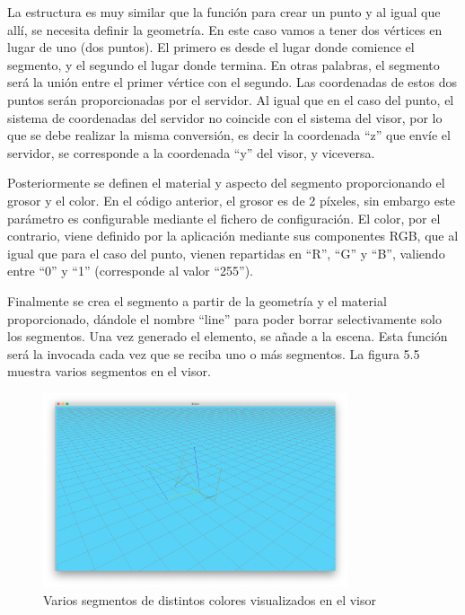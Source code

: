 La estructura es muy similar que la función para crear un punto y al igual que allí, se necesita definir la geometría. En este caso vamos a tener dos vértices en lugar de uno (dos puntos). El primero es desde el lugar donde comience el segmento, y el segundo el lugar donde termina. En otras palabras, el segmento será la unión entre el primer vértice con el segundo. Las coordenadas de estos dos puntos serán proporcionadas por el servidor. Al igual que en el caso del punto, el sistema de coordenadas del servidor no coincide con el sistema del visor, por lo que se debe realizar la misma conversión, es decir la coordenada ``z'' que envíe el servidor, se corresponde a la coordenada ``y'' del visor, y viceversa.

Posteriormente se definen el material y aspecto del segmento proporcionando el grosor y el color. En el código anterior, el grosor es de 2 píxeles, sin embargo este parámetro es configurable mediante el fichero de configuración. El color, por el contrario, viene definido por la aplicación mediante sus componentes RGB, que al igual que para el caso del punto, vienen repartidas en ``R'', ``G'' y ``B'', valiendo entre ``0''  y ``1'' (corresponde al valor ``255'').

Finalmente se crea el segmento a partir de la geometría y el material proporcionado, dándole el nombre ``line'' para poder borrar selectivamente solo los segmentos. Una vez generado el elemento, se añade a la escena. Esta función será la invocada cada vez que se reciba uno o más segmentos. La figura 5.5 muestra varios segmentos en el visor.

\begin{figure}[H]
  \begin{center}
    \includegraphics[width=0.8\textwidth]{figures/visualizarlineas.png}
		\caption{Varios segmentos de distintos colores visualizados en el visor}
		\label{fig.visualizarsegmentos}
		\end{center}
\end{figure}

